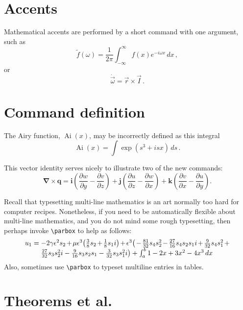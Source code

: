 \documentclass[12pt,a4paper]{extarticle}
\begin{document}
\section{Accents}

Mathematical accents are performed by a short command with one 
argument, such as
\[
	\tilde f(\omega)=\frac{1}{2\pi}
	\int_{-\infty}^\infty f(x)e^{-i\omega x}\,dx\,,
\]
or
\[
	\dot{\vec \omega}=\vec r\times\vec I\,.
\]





\section{Command definition}

\newcommand{\Ai}{\operatorname{Ai}} 
The Airy function, $\Ai(x)$, may be incorrectly defined as this 
integral
\[
	\Ai(x)=\int\exp(s^3+isx)\,ds\,.
\]

\newcommand{\D}[2]{\frac{\partial #2}{\partial #1}}
\newcommand{\DD}[2]{\frac{\partial^2 #2}{\partial #1^2}}
\renewcommand{\vec}[1]{\boldsymbol{#1}}

This vector identity serves nicely to illustrate two of the new 
commands:
\[
	\vec\nabla\times\vec q
	=\vec i\left(\D yw-\D zv\right)
	+\vec j\left(\D zu-\D xw\right)
	+\vec k\left(\D xv-\D yu\right).
\]

Recall that typesetting multi-line mathematics is an art normally too hard for computer recipes.  Nonetheless, if you need to be automatically flexible about multi-line mathematics, and you do not mind some rough typesetting, then perhaps invoke \verb|\parbox| to help as follows: 
\newcommand{\parmath}[2][0.8\linewidth]{\parbox[t]{#1}%
    {\raggedright\linespread{1.2}\selectfont\(#2\)}}
\[
u_1=\parmath{ -2 \gamma  \epsilon^{2} s_{2}+\mu  \epsilon^{3} \big( \frac{3}{8} s_{2}+\frac{1}{8} s_{1} i\big)+\epsilon^{3} \big( -\frac{81}{32} s_{4} s_{2}^{2}-\frac{27}{16} s_{4} s_{2} s_{1} i+\frac{9}{32} s_{4} s_{1}^{2}+\frac{27}{32} s_{3} s_{2}^{2} i-\frac{9}{16} s_{3} s_{2} s_{1}-\frac{3}{32} s_{3} s_{1}^{2} i\big) +\int_a^b 1-2x+3x^2-4x^3\,dx }
\]
Also, sometimes use \verb|\parbox| to typeset multiline entries in tables.


\section{Theorems et al.}

\newtheorem{theorem}{Theorem}
\newtheorem{corollary}[theorem]{Corollary}
\newtheorem{lemma}[theorem]{Lemma}
\newtheorem{definition}[theorem]{Definition}
\end{document}
